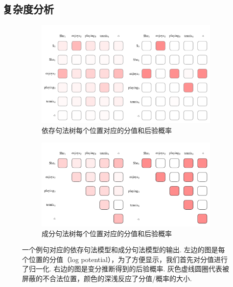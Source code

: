 \subsection{复杂度分析}


\begin{figure}[tb]
  \centering
  \begin{subfigure}[b]{0.9\textwidth}
    \centering
    \includegraphics[scale=0.75]{figures/dep-probs.pdf}
    \caption{依存句法树每个位置对应的分值和后验概率}
    \label{fig:dep-probs}
  \end{subfigure}
  \begin{subfigure}[b]{0.9\textwidth}
    \centering
    \includegraphics[scale=0.75]{figures/con-probs.pdf}
    \caption{成分句法树每个位置对应的分值和后验概率}
    \label{fig:con-probs}
  \end{subfigure}
  \caption{一个例句对应的依存句法模型和成分句法模型的输出. 左边的图是每个位置的分值（log potential），为了方便显示，我们首先对分值进行了归一化.
    右边的图是变分推断得到的后验概率. 灰色虚线圆圈代表被屏蔽的不合法位置，颜色的深浅反应了分值/概率的大小.}

  \label{fig:vi-probs}
\end{figure}

